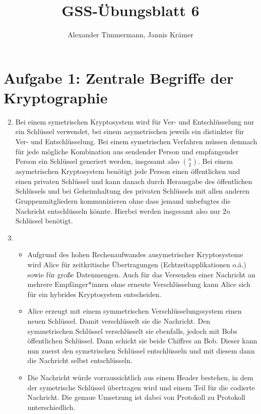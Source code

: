 \documentclass[a4paper,11pt,ngerman]{scrartcl}
\author{Alexander Timmermann, Jannis Krämer}
\title{GSS-Übungsblatt 6}
\date{}
\begin{document}
\maketitle
\thispagestyle{empty}

\doublespace

\section*{Aufgabe 1: Zentrale Begriffe der Kryptographie}
  \begin{enumerate}[\bf 1.]
    \setcounter{enumi}{1}
    \item
      Bei einem symetrischen Kryptosystem wird für Ver- und Entschlüsselung
      nur ein Schlüssel verwendet, bei einem asymetrischen jeweils ein distinkter für
      Ver- und Entschlüsselung. Bei einem symetrischen Verfahren müssen demnach
      für jede mögliche Kombination aus sendender Person und empfangender Person ein
      Schlüssel generiert werden, insgesamt also $\binom{n}{2}$. Bei einem asymetrischen
      Kryptosystem benötigt jede Person einen öffentlichen und einen privaten Schlüssel
      und kann danach durch Herausgabe des öffentlichen Schlüssels und bei Geheimhaltung
      des privaten Schlüssels mit allen anderen Gruppenmitgliedern kommunizieren ohne
      dass jemand unbefugtes die Nachricht entschlüsseln könnte. Hierbei werden insgesamt
      also nur $2n$ Schlüssel benötigt.
    \item
      \begin{itemize}
        \item
          Aufgrund des hohen Rechenaufwandes ausymetrischer Kryptosysteme wird
          Alice für zeitkritische Übertragungen (Echtzeitapplikationen o.ä.) sowie
          für große Datenmengen. Auch für das Versenden einer Nachricht an mehrere
          Empfänger*innen ohne erneute Verschlüsselung kann Alice sich für ein
          hybrides Kryptosystem entscheiden.
        \item
          Alice erzeugt mit einem symmetrischen Verschlüsselungssystem einen
          neuen Schlüssel. Damit verschlüsselt sie die Nachricht. Den symmetrischen
          Schlüssel verschlüsselt sie ebenfalls, jedoch mit Bobs öffentlichen Schlüssel.
          Dann schickt sie beide Chiffres an Bob. Dieser kann nun zuerst den symetrischen
          Schlüssel entschlüsseln und mit diesem dann die Nachricht selbst entschlüsseln.
        \item
          Die Nachricht würde vorraussichtlich aus einem Header bestehen, in dem der
          symetrische Schlüssel übertragen wird und einem Teil für die codierte Nachricht.
          Die genaue Umsetzung ist dabei von Protokoll zu Protokoll unterschiedlich.
      \end{itemize}
  \end{enumerate}
\end{document}
